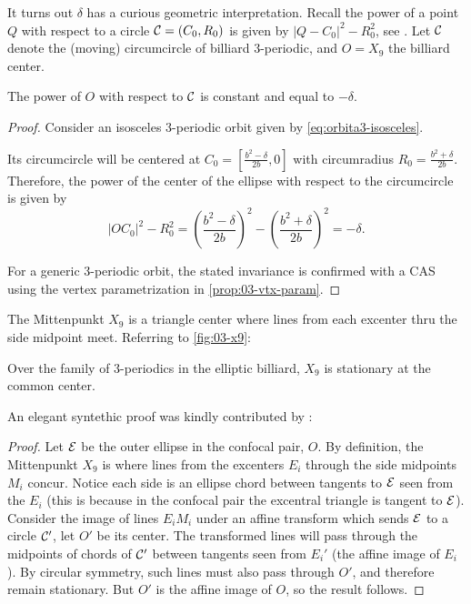 It turns out $\delta$ has a curious geometric interpretation. Recall the power of a point $Q$ with respect to a circle $\mathcal{C}=(C_0,R_0)$ is given by $|Q-C_0|^2-R_0^2$, see \cite[Circle Power]{mw}. Let $\mathcal{C}$ denote the (moving) circumcircle of billiard 3-periodic, and $O=X_9$ the billiard center.

\begin{proposition}
The power of $O$ with respect to $\mathcal{C}$ is constant and equal to $-\delta$.
\end{proposition}

\begin{proof}
Consider an isosceles 3-periodic orbit given by \cref{eq:orbita3-isosceles}.  
  
	Its circumcircle will be centered at $C_0=[ {\frac { {b}^{2}-\delta}{2b}},0]$ with circumradius $R_0=\frac {{b}^{2}+\delta}{2b}.$
	Therefore, the power of the center of the ellipse with respect to the circumcircle is given by  
	$$|OC_0|^2-R_0^2=\left(\frac { {b}^{2}-\delta}{2b}\right)^2 - \left(\frac {{b}^{2}+\delta}{2b}\right)^2=-\delta.$$
	
	For a generic 3-periodic orbit, the stated invariance is confirmed with a CAS using the vertex parametrization in \cref{prop:03-vtx-param}.  
\end{proof}

The Mittenpunkt $X_9$ is a triangle center where lines from each excenter thru the side midpoint meet. Referring to \cref{fig:03-x9}:
\begin{theorem}
Over the family of 3-periodics in the elliptic billiard, $X_9$ is stationary at the common center.
\end{theorem}

An elegant syntethic proof was kindly contributed by \cite{olga19_mitten}:

\begin{proof}
Let $\mathcal{E}$ be the outer ellipse in the confocal pair, $O$. By definition, the Mittenpunkt $X_9$ is where lines from the excenters $E_i$ through the side midpoints $M_i$ concur. Notice each side is an ellipse chord between tangents to $\mathcal{E}$ seen from the $E_i$ (this is because in the confocal pair the excentral triangle is tangent to $\mathcal{E}$). Consider the image of lines $E_i M_i$ under an affine transform which sends $\mathcal{E}$ to a circle $\mathcal{C}'$, let $O'$ be its center. The transformed lines will pass through the midpoints of chords of $\mathcal{C}'$ between tangents seen from $E_i'$ (the affine image of $E_i$). By circular symmetry, such lines must also pass through $O'$, and therefore remain stationary. But $O'$ is the affine image of $O$, so the result follows.
\end{proof}


